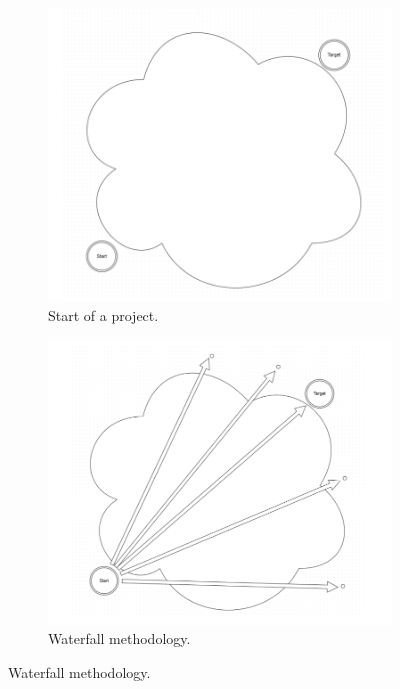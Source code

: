 \documentclass{l4proj}
\begin{document}
\begin{figure}[H]
\begin{subfigure}{.3\textwidth}
	\centering
	\includegraphics[width=\textwidth]{images/projectInitial}
	\caption{Start of a project.}
	\label{projectInitial}
\end{subfigure}
\begin{subfigure}{.3\textwidth}
	\centering
	\includegraphics[width=\textwidth]{images/projectStart}
	\caption{Waterfall methodology.}
	\label{projectStart}
\end{subfigure}

\end{figure}
\end{document}
